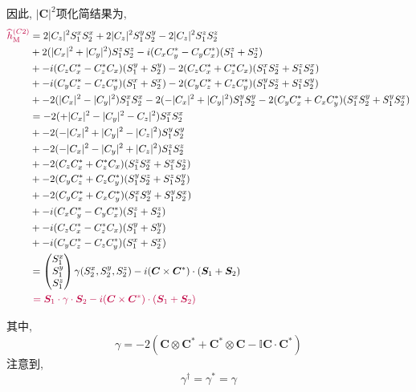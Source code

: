 \documentclass[a4paper, 12pt]{article}
\newcommand{\purple}{\textcolor{purple}}
\begin{document}
因此, \(|\bm{C}|^2\)项化简结果为,
\begin{equation}
  \begin{aligned}
    \purple{\widehat{h}_{\text{M}}^{(C2)}}
    &= 2|C_z|^2S_1^xS_2^x + 2|C_z|^2S_1^yS_2^y -2|C_z|^2S_1^zS_2^z\\
    &+ 2(|C_x|^2 + |C_y|^2)S_1^zS_2^z - i(C_xC_y^* - C_yC_x^*)(S_1^z + S_2^z)\\
    &+ -i(C_zC_x^* - C_z^*C_x)(S_1^y + S_2^y) - 2(C_zC_x^* + C_z^*C_x)(S_1^xS_2^z + S_1^zS_2^x)\\
    &+ -i(C_yC_z^* - C_zC_y^*)(S_1^x + S_2^x) - 2(C_yC_z^* + C_zC_y^*)(S_1^yS_2^z + S_1^zS_2^y)\\
    &+ -2(|C_x|^2-|C_y|^2)S_1^xS_2^x -2(-|C_x|^2+|C_y|^2)S_1^yS_2^y- 2(C_yC_x^*+C_xC_y^*)(S_1^xS_2^y+S_1^yS_2^x)\\
    &= -2(+|C_x|^2-|C_y|^2-C_z|^2)S_1^xS_2^x\\
    &+ -2(-|C_x|^2+|C_y|^2-|C_z|^2)S_1^yS_2^y\\
    &+ -2(-|C_x|^2-|C_y|^2+|C_z|^2)S_1^zS_2^z\\
    &+ -2(C_zC_x^* + C_z^*C_x)(S_1^zS_2^x + S_1^xS_2^z)\\
    &+ -2(C_yC_z^* + C_zC_y^*)(S_1^yS_2^z + S_1^zS_2^y)\\
    &+ -2(C_yC_x^* + C_xC_y^*)(S_1^xS_2^y + S_1^yS_2^x)\\
    &+ -i(C_xC_y^* - C_yC_x^*)(S_1^z + S_2^z)\\
    &+ -i(C_zC_x^* - C_z^*C_x)(S_1^y + S_2^y)\\
    &+ -i(C_yC_z^* - C_zC_y^*)(S_1^x + S_2^x)\\
    &= \begin{pmatrix}
      S_1^x\\
      S_1^y\\
      S_1^z
    \end{pmatrix}\gamma(S_2^x, S_2^y, S_2^z) -i (\bm{C}\times\bm{C}^*)\cdot(\bm{S}_1+\bm{S}_2)\\
    &\ \vspace*{3pt}\purple{= \bm{S}_1\cdot\gamma\cdot\bm{S}_2 -i (\bm{C}\times\bm{C}^*)\cdot(\bm{S}_1+\bm{S}_2)}
  \end{aligned}
\end{equation}

其中,
\begin{equation}
  \gamma = -2(\bm{C}\otimes{}\bm{C}^* + \bm{C}^*\otimes{}\bm{C} - \mathbb{I}\bm{C}\cdot{}\bm{C}^*)
\end{equation}
注意到, 
\begin{equation}
  \gamma^\dagger = \gamma^* = \gamma
\end{equation}
\end{document}
